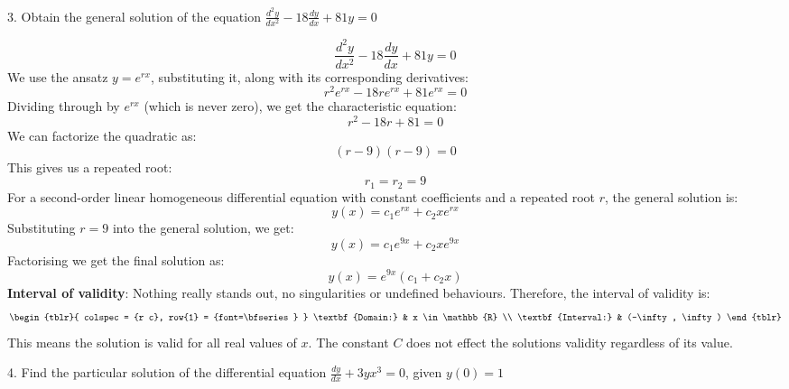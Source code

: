 \documentclass[a4paper, 12pt]{report}
\def\ni{green!60!black!40!white}
\begin{document}
    
    
    \newpage
    
    \begin{tcolorbox}[title={\color{black}\section{Q3}}, colback=white, colframe=\ni, boxrule=1mm, width=1\textwidth]
        3. Obtain the general solution of the equation \( \frac{d^2 y}{dx^2} - 18 \frac{dy}{dx} + 81y = 0 \) 
    \end{tcolorbox}
    
    

    \[ \frac{d^2 y}{dx^2} - 18 \frac{dy}{dx} + 81y = 0 \]    
    We use the ansatz \( y = e^{rx} \), substituting it, along with its corresponding derivatives:
    \[r^2 e^{rx} - 18r e^{rx} + 81 e^{rx} = 0\]
    Dividing through by \( e^{rx} \) (which is never zero), we get the characteristic equation:
    \[ r^2 - 18r + 81 = 0 \]
    We can factorize the quadratic as:
    \[(r - 9)(r - 9) = 0 \]
    This gives us a repeated root:
    \[ r_1 = r_2 = 9 \]
    For a second-order linear homogeneous differential equation with constant coefficients and a repeated root \( r \), the general solution is:
    \[ y(x) = c_1 e^{rx} + c_2 x e^{rx} \]
    Substituting \( r = 9 \) into the general solution, we get:
    \[ y(x) = c_1 e^{9x} + c_2 x e^{9x} \]
    Factorising we get the final solution as:
    \[ \boxed{y(x) = e^{9x} (c_1 + c_2 x)} \]
    \textbf{Interval of validity}: Nothing really stands out, no singularities or undefined behaviours. Therefore, the interval of validity is:
    \[
    \begin{tblr}{
            colspec = {r c},
            row{1} = {font=\bfseries}
        }
        \textbf{Domain:} & x \in \mathbb{R} \\
        \textbf{Interval:} & (-\infty, \infty)
    \end{tblr}
    \]
    This means the solution is valid for all real values of \(x\). The constant \(C\) does not effect the solutions validity regardless of its value.
       
    \newpage
    
    \begin{tcolorbox}[title={\color{black}\section{Q4}}, colback=white, colframe=\ni, boxrule=1mm, width=1\textwidth]
        4. Find the particular solution of the differential equation \( \frac{dy}{dx} + 3y x^3 = 0 \), given \( y(0) = 1 \)
    \end{tcolorbox}
    
\end{document}
